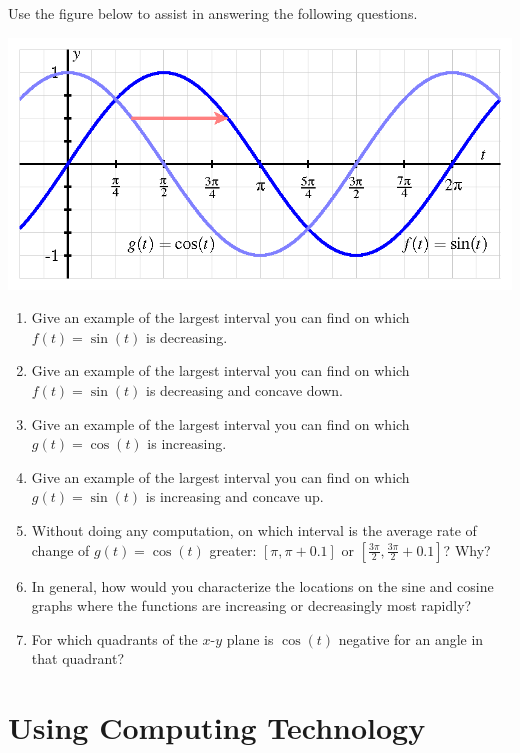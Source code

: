 \documentclass[nooutcomes]{ximera}
\begin{document}
\begin{exploration}
Use the figure below to assist in answering the following questions.
\begin{image}
\includegraphics{sine-and-cosine-graphs.png}
\end{image}

\begin{enumerate}[label=\alph*.]
\item
Give an example of the largest interval you can find on which \(f(t) = \sin(t)\) is decreasing.%
\item
Give an example of the largest interval you can find on which \(f(t) = \sin(t)\) is decreasing and concave down.%
\item
Give an example of the largest interval you can find on which \(g(t) = \cos(t)\) is increasing.%
\item
Give an example of the largest interval you can find on which \(g(t) = \sin(t)\) is increasing and concave up.%
\item
Without doing any computation, on which interval is the average rate of change of \(g(t) = \cos(t)\) greater:  \(\left[\pi, \pi+0.1\right]\) or \(\left[\frac{3\pi}{2}, \frac{3\pi}{2} + 0.1\right]\)?  Why?%
\item
In general, how would you characterize the locations on the sine and cosine graphs where the functions are increasing or decreasingly most rapidly?%
\item
For which quadrants of the \(x\)-\(y\) plane is \(\cos(t)\) negative for an angle in that quadrant?%
\end{enumerate}

\end{exploration}


\section{Using Computing Technology}
\end{document}
